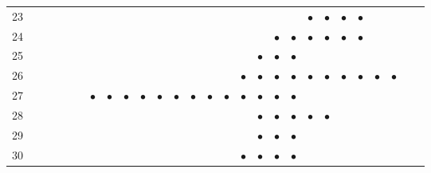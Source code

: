\documentclass[text.tex]{subfiles}
\begin{document}
\begin{table}
{\begin{tabular}{l|cccccccccccccccccccccccccc}
23  &           &           &           &           &           &           &           &           &           &           &           &           &           &           &           &           &           &           & $\bullet$ & $\bullet$ & $\bullet$ & $\bullet$ &           &           &           \\
24  &           &           &           &           &           &           &           &           &           &           &           &           &           &           &           &           & $\bullet$ & $\bullet$ & $\bullet$ & $\bullet$ & $\bullet$ & $\bullet$ &           &           &           \\
25  &           &           &           &           &           &           &           &           &           &           &           &           &           &           &           & $\bullet$ & $\bullet$ & $\bullet$ &           &           &           &           &           &           &           \\
26  &           &           &           &           &           &           &           &           &           &           &           &           &           &           & $\bullet$ & $\bullet$ & $\bullet$ & $\bullet$ & $\bullet$ & $\bullet$ & $\bullet$ & $\bullet$ & $\bullet$ & $\bullet$ &           \\
27  &           &           &           &           &           & $\bullet$ & $\bullet$ & $\bullet$ & $\bullet$ & $\bullet$ & $\bullet$ & $\bullet$ & $\bullet$ & $\bullet$ & $\bullet$ & $\bullet$ & $\bullet$ & $\bullet$ &           &           &           &           &           &           &           \\
28  &           &           &           &           &           &           &           &           &           &           &           &           &           &           &           & $\bullet$ & $\bullet$ & $\bullet$ & $\bullet$ & $\bullet$ &           &           &           &           &           \\
29  &           &           &           &           &           &           &           &           &           &           &           &           &           &           &           & $\bullet$ & $\bullet$ & $\bullet$ &           &           &           &           &           &           &           \\
30  &           &           &           &           &           &           &           &           &           &           &           &           &           &           & $\bullet$ & $\bullet$ & $\bullet$ & $\bullet$ &           &           &           &           &           &           &           \\

\end{tabular}}
\end{table}
\end{document}
